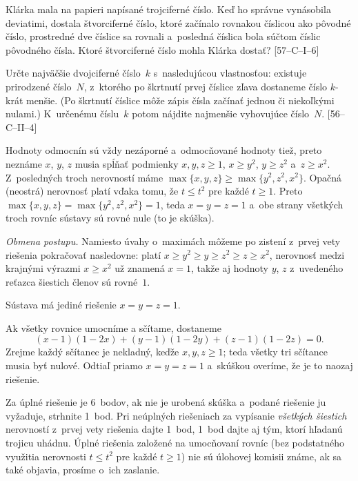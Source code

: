 {Klárka mala na papieri napísané trojciferné číslo. Keď ho správne
vynásobila deviatimi, dostala štvorciferné číslo, ktoré začínalo rovnakou
číslicou ako pôvodné číslo, prostredné dve číslice sa rovnali
a~posledná číslica bola súčtom číslic pôvodného čísla.
Ktoré štvorciferné číslo mohla Klárka dostať?
[57--C--I--6]

\D
Určte najväčšie dvojciferné číslo~$k$ s~nasledujúcou vlastnosťou:
existuje prirodzené číslo~$N$, z~ktorého po škrtnutí prvej číslice
zľava dostaneme číslo $k$-krát menšie. (Po škrtnutí číslice môže
zápis čísla začínať jednou či niekoľkými nulami.) K~určenému
číslu~$k$ potom nájdite najmenšie vyhovujúce číslo~$N$.
[56--C--II--4]
}

{%
Hodnoty odmocnín sú vždy nezáporné a~odmocňované hodnoty tiež,
preto neznáme $x$, $y$, $z$ musia spĺňať podmienky $x,y,z\ge1$,
$x\ge y^2$, $y\ge z^2$ a~$z\ge x^2$.
Z~posledných troch nerovností máme $\max\{x,y,z\}\ge
\max\{y^2,z^2,x^2\}$. Opačná (neostrá) nerovnosť platí vďaka tomu, že
$t\le t^2$ pre každé $t\ge1$. Preto
$\max\{x,y,z\}=\max\{y^2,z^2,x^2\}=1$, teda $x=y=z=1$ a~obe
strany všetkých troch rovníc sústavy sú rovné nule (to je skúška).

\smallskip
{\it Obmena postupu.} Namiesto úvahy o~maximách môžeme po zistení
z~prvej vety riešenia pokračovať nasledovne: platí
$x\ge y^2\ge y\ge z^2\ge z\ge x^2$,
nerovnosť medzi krajnými výrazmi $x\ge x^2$ už znamená $x=1$,
takže aj hodnoty $y$, $z$ z~uvedeného reťazca šiestich členov
sú rovné~$1$.

\zaver
Sústava má jediné riešenie $x=y=z=1$.

\ineriesenie
{}
Ak všetky rovnice umocníme a sčítame, dostaneme
$$
(x-1)(1-2x)+(y-1)(1-2y)+(z-1)(1-2z)=0.
$$
Zrejme každý sčítanec je nekladný, keďže $x,y,z\ge1$; teda všetky tri sčítance musia byť nulové. Odtiaľ priamo $x=y=z=1$ a~skúškou overíme, že je to naozaj riešenie.

\nobreak\medskip\petit\noindent
Za úplné riešenie je 6~bodov, ak nie je urobená
skúška a~podané riešenie ju vyžaduje, strhnite 1~bod.
Pri neúplných riešeniach za vypísanie {\it všetkých šiestich\/}
nerovností z~prvej vety
riešenia dajte 1~bod, 1~bod dajte aj tým, ktorí hľadanú trojicu
uhádnu. Úplné riešenia založené na umocňovaní rovníc (bez
podstatného využitia nerovnosti $t\le t^2$ pre každé $t\ge1$)
nie sú úlohovej komisii známe, ak sa také objavia, prosíme
o~ich zaslanie.
\endpetit
\bigbreak
}

